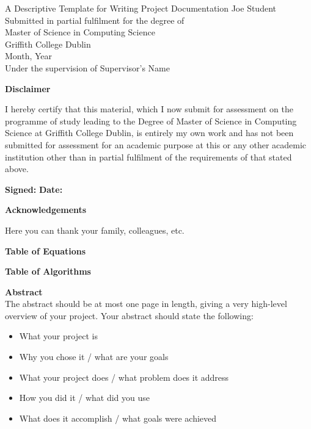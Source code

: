 \documentclass{report}[a4paper,12pt,onecolumn]
\begin{document}
\begin{center}
    \Large{A Descriptive Template for Writing Project Documentation}
    \linebreak[4]
    \linebreak[4]
    \linebreak[4]
    Joe Student
    \linebreak[4]
    \linebreak[4]
    \linebreak[4]
    Submitted in partial fulfilment for the degree of\\
    Master of Science in Computing Science\\
    Griffith College Dublin\\
    Month, Year\\
    Under the supervision of Supervisor's Name
\end{center}
\newpage

\textbf{Disclaimer}

I hereby certify that this material, which I now submit for assessment on the
programme of study leading to the Degree of Master of Science in Computing 
Science at Griffith College Dublin, is entirely my own work and has not been 
submitted for assessment for an academic purpose at this or any other academic 
institution other than in partial fulfilment of the requirements of that stated 
above.

\textbf{Signed:} \hskip 60mm \textbf{Date:}
\newpage

\textbf{Acknowledgements}

Here you can thank your family, colleagues, etc.
\newpage

\tableofcontents
\newpage

\textbf{Table of Equations}
\newpage

\listoffigures
\newpage

\listoftables
\newpage

\textbf{Table of Algorithms}
\newpage

\textbf{Abstract}\\
The abstract should be at most one page in length, giving a very high-level overview of your project. Your abstract should state the following:
\begin{itemize}
    \item What your project is
    \item Why you chose it / what are your goals
    \item What your project does / what problem does it address
    \item How you did it / what did you use
    \item What does it accomplish / what goals were achieved
\end{itemize}
\end{document}
